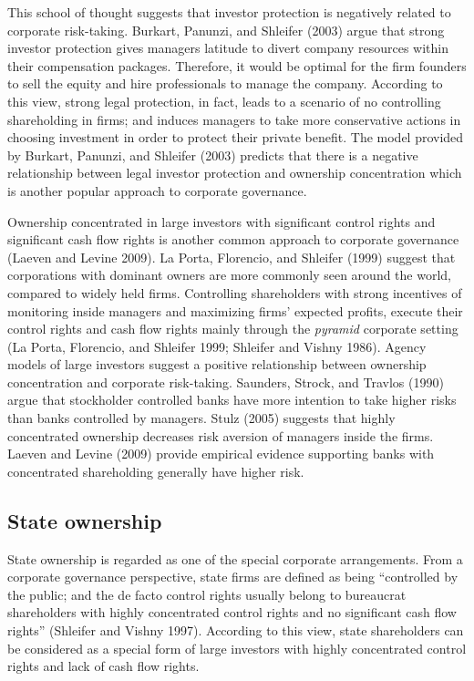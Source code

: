 \documentclass{article}
\begin{document}
This school of thought suggests that investor protection is negatively
related to corporate risk-taking. Burkart, Panunzi, and Shleifer (2003)
argue that strong investor protection gives managers latitude to divert
company resources within their compensation packages. Therefore, it
would be optimal for the firm founders to sell the equity and hire
professionals to manage the company. According to this view, strong
legal protection, in fact, leads to a scenario of no controlling
shareholding in firms; and induces managers to take more conservative
actions in choosing investment in order to protect their private
benefit. The model provided by Burkart, Panunzi, and Shleifer (2003)
predicts that there is a negative relationship between legal investor
protection and ownership concentration which is another popular approach
to corporate governance.

Ownership concentrated in large investors with significant control
rights and significant cash flow rights is another common approach to
corporate governance (Laeven and Levine 2009). La Porta, Florencio, and
Shleifer (1999) suggest that corporations with dominant owners are more
commonly seen around the world, compared to widely held firms.
Controlling shareholders with strong incentives of monitoring inside
managers and maximizing firms' expected profits, execute their control
rights and cash flow rights mainly through the \emph{pyramid} corporate
setting (La Porta, Florencio, and Shleifer 1999; Shleifer and Vishny
1986). Agency models of large investors suggest a positive relationship
between ownership concentration and corporate risk-taking. Saunders,
Strock, and Travlos (1990) argue that stockholder controlled banks have
more intention to take higher risks than banks controlled by managers.
Stulz (2005) suggests that highly concentrated ownership decreases risk
aversion of managers inside the firms. Laeven and Levine (2009) provide
empirical evidence supporting banks with concentrated shareholding
generally have higher risk.

\hypertarget{state-ownership}{%
\subsection{State ownership}\label{state-ownership}}

State ownership is regarded as one of the special corporate
arrangements. From a corporate governance perspective, state firms are
defined as being ``controlled by the public; and the de facto control
rights usually belong to bureaucrat shareholders with highly
concentrated control rights and no significant cash flow rights''
(Shleifer and Vishny 1997). According to this view, state shareholders
can be considered as a special form of large investors with highly
concentrated control rights and lack of cash flow rights.
\end{document}
